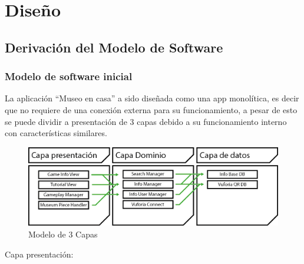 \documentclass[12pt]{article}
\makeatletter
\renewcommand\paragraph{\@startsection{paragraph}{4}{\z@}%
	{-2.5ex\@plus -1ex \@minus -.25ex}%
	{1.25ex \@plus .25ex}%
	{\normalfont\normalsize\bfseries}}
\makeatother
\begin{document}
\newpage


\newpage


\newpage


\newpage



\newpage
\section{Diseño}

\subsection{Derivación del Modelo de Software}
\subsubsection{Modelo de software inicial}
La aplicación “Museo en casa” a sido diseñada como una app monolítica, es decir que no requiere de una conexión externa para su funcionamiento, a pesar de esto se puede dividir a presentación de 3 capas debido a su funcionamiento interno con características similares.

\begin{figure}[H]
\centerline{\includegraphics[width=15cm]{imgs/Modelo3Capas.png}}
\caption{Modelo de 3 Capas}
\label{fig_3Capas}
\end{figure}

Capa presentación:
\end{document}
